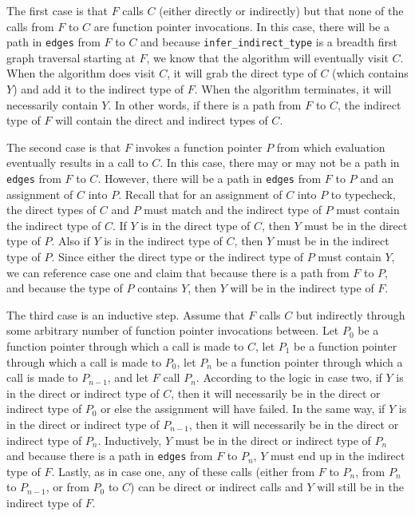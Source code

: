 The first case is that $F$ calls $C$ (either directly or indirectly) but that none of the calls from $F$ to $C$ are function pointer invocations.  In this case, there will be a path in \lstinline{edges} from $F$ to $C$ and because \lstinline{infer_indirect_type} is a breadth first graph traversal starting at $F$, we know that the algorithm will eventually visit $C$.  When the algorithm does visit $C$, it will grab the direct type of $C$ (which contains $Y$) and add it to the indirect type of $F$.  When the algorithm terminates, it will necessarily contain $Y$.  In other words, if there is a path from $F$ to $C$, the indirect type of $F$ will contain the direct and indirect types of $C$.

The second case is that $F$ invokes a function pointer $P$ from which evaluation eventually results in a call to $C$.  In this case, there may or may not be a path in \lstinline{edges} from $F$ to $C$.  However, there will be a path in \lstinline{edges} from $F$ to $P$ and an assignment of $C$ into $P$.  Recall that for an assignment of $C$ into $P$ to typecheck, the direct types of $C$ and $P$ must match and the indirect type of $P$ must contain the indirect type of $C$.  If $Y$ is in the direct type of $C$, then $Y$ must be in the direct type of $P$.  Also if $Y$ is in the indirect type of $C$, then $Y$ must be in the indirect type of $P$.  Since either the direct type or the indirect type of $P$ must contain $Y$, we can reference case one and claim that because there is a path from $F$ to $P$, and because the type of $P$ contains $Y$, then $Y$ will be in the indirect type of $F$.  

The third case is an inductive step.  Assume that $F$ calls $C$ but indirectly through some arbitrary number of function pointer invocations between.  Let $P_0$ be a function pointer through which a call is made to $C$, let $P_1$ be a function pointer through which a call is made to $P_0$, let $P_n$ be a function pointer through which a call is made to $P_{n-1}$, and let $F$ call $P_n$.  According to the logic in case two, if $Y$ is in the direct or indirect type of $C$, then it will necessarily be in the direct or indirect type of $P_0$ or else the assignment will have failed.  In the same way, if $Y$ is in the direct or indirect type of $P_{n-1}$, then it will necessarily be in the direct or indirect type of $P_{n}$.  Inductively, $Y$ must be in the direct or indirect type of $P_n$ and because there is a path in \lstinline{edges} from $F$ to $P_n$, $Y$ must end up in the indirect type of $F$.  Lastly, as in case one, any of these calls (either from $F$ to $P_n$, from $P_n$ to $P_{n-1}$, or from $P_0$ to $C$) can be direct or indirect calls and $Y$ will still be in the indirect type of $F$.

